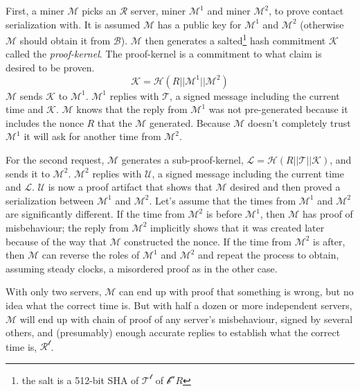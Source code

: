 \documentclass[letterpaper,11pt]{article}
\begin{document}
First, a miner $\mathcal{M}$ picks an $\mathcal{R}$ server, miner $\mathcal{M^1}$ and miner $\mathcal{M^2}$, to prove contact serialization with. It is assumed $\mathcal{M}$ has a public key for $\mathcal{M^1}$ and $\mathcal{M^2}$ (otherwise $\mathcal{M}$ should obtain it from $\mathcal{B}$). $\mathcal{M}$ then generates a salted\footnote{the salt is a 512-bit SHA of $\mathcal{T^t}$ of $\mathcal{b^n}$$R$} hash commitment $\mathcal{K}$ called the \textit{proof-kernel}. The proof-kernel is a commitment to what claim is desired to be proven. $$\mathcal{K} = \mathcal{H}(R || \mathcal{M^1} || \mathcal{M^2})$$ $\mathcal{M}$ sends $\mathcal{K}$ to $\mathcal{M^1}$. $\mathcal{M^1}$ replies with $\mathcal{T}$, a signed message including the current time and $\mathcal{K}$. $\mathcal{M}$ knows that the reply from $\mathcal{M^1}$ was not pre-generated because it includes the nonce $R$ that the $\mathcal{M}$ generated. Because $\mathcal{M}$ doesn't completely trust $\mathcal{M^1}$ it will ask for another time from $\mathcal{M^2}$.\newline

For the second request, $\mathcal{M}$ generates a sub-proof-kernel, $\mathcal{L} = \mathcal{H}(R || \mathcal{T} || \mathcal{K})$, and sends it to $\mathcal{M^2}$. $\mathcal{M^2}$ replies with $\mathcal{U}$, a signed message including the current time and $\mathcal{L}$. $\mathcal{U}$ is now a proof artifact that shows that $\mathcal{M}$ desired and then proved a serialization between $\mathcal{M^1}$ and $\mathcal{M^2}$. Let's assume that the times from $\mathcal{M^1}$ and $\mathcal{M^2}$ are significantly different. If the time from $\mathcal{M^2}$ is before $\mathcal{M^1}$, then $\mathcal{M}$ has proof of misbehaviour; the reply from $\mathcal{M^2}$ implicitly shows that it was created later because of the way that $\mathcal{M}$ constructed the nonce. If the time from $\mathcal{M^2}$ is after, then $\mathcal{M}$ can reverse the roles of $\mathcal{M^1}$ and $\mathcal{M^2}$ and repeat the process to obtain, assuming steady clocks, a misordered proof as in the other case.\newline

With only two servers, $\mathcal{M}$ can end up with proof that something is wrong, but no idea what the correct time is. But with half a dozen or more independent servers, $\mathcal{M}$ will end up with chain of proof of any server's misbehaviour, signed by several others, and (presumably) enough accurate replies to establish what the correct time is, $\mathcal{R^t}$.\newline
\end{document}
